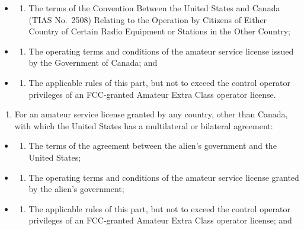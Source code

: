\documentclass[
  letterpaper,
  DIV=11,
  numbers=noendperiod]{scrreport}
\providecommand{\tightlist}{%
  \setlength{\itemsep}{0pt}\setlength{\parskip}{0pt}}\usepackage{longtable,booktabs,array}
\begin{document}
\begin{itemize}
\item
  \begin{enumerate}
  \def\labelenumi{(\arabic{enumi})}
  \tightlist
  \item
    The terms of the Convention Between the United States and Canada
    (TIAS No.~2508) Relating to the Operation by Citizens of Either
    Country of Certain Radio Equipment or Stations in the Other Country;
  \end{enumerate}
\item
  \begin{enumerate}
  \def\labelenumi{(\arabic{enumi})}
  \setcounter{enumi}{1}
  \tightlist
  \item
    The operating terms and conditions of the amateur service license
    issued by the Government of Canada; and
  \end{enumerate}
\item
  \begin{enumerate}
  \def\labelenumi{(\arabic{enumi})}
  \setcounter{enumi}{2}
  \tightlist
  \item
    The applicable rules of this part, but not to exceed the control
    operator privileges of an FCC-granted Amateur Extra Class operator
    license.
  \end{enumerate}
\end{itemize}

\begin{enumerate}
\def\labelenumi{(\alph{enumi})}
\setcounter{enumi}{1}
\tightlist
\item
  For an amateur service license granted by any country, other than
  Canada, with which the United States has a multilateral or bilateral
  agreement:
\end{enumerate}

\begin{itemize}
\item
  \begin{enumerate}
  \def\labelenumi{(\arabic{enumi})}
  \tightlist
  \item
    The terms of the agreement between the alien's government and the
    United States;
  \end{enumerate}
\item
  \begin{enumerate}
  \def\labelenumi{(\arabic{enumi})}
  \setcounter{enumi}{1}
  \tightlist
  \item
    The operating terms and conditions of the amateur service license
    granted by the alien's government;
  \end{enumerate}
\item
  \begin{enumerate}
  \def\labelenumi{(\arabic{enumi})}
  \setcounter{enumi}{2}
  \tightlist
  \item
    The applicable rules of this part, but not to exceed the control
    operator privileges of an FCC-granted Amateur Extra Class operator
    license; and
  \end{enumerate}
\end{itemize}
\end{document}
